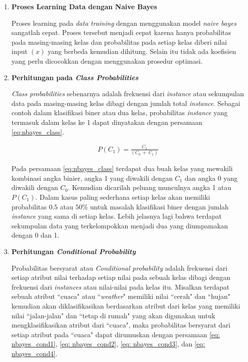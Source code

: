 \begin{subs}
\begin{enumerate}[label=\textbf{\arabic*).}]
		\item \textbf{Proses Learning Data dengan Naive Bayes}
	
		Proses learning pada \textit{data training} dengan menggunakan model \textit{naive bayes} sangatlah cepat. Proses tersebut menjadi cepat karena hanya probabilitas pada masing-masing kelas dan probabilitas pada setiap kelas diberi nilai input $(x)$ yang berbeda kemudian dihitung. Selain itu tidak ada koefisien yang perlu dicocokkan dengan menggunakan prosedur optimasi.
	
		\item \textbf{Perhitungan pada \textit{Class Probabilities}}
	
		\textit{Class probabilities} sebenarnya adalah frekuensi dari \textit{instance} atau sekumpulan data pada masing-masing kelas dibagi dengan jumlah total \textit{instance}. Sebagai contoh dalam klasifikasi biner atau dua kelas, probabilitas \textit{instance} yang termasuk dalam kelas ke 1 dapat dinyatakan dengan persamaan \ref{eq:nbayes_class}.
		
		\begin{equation}\label{eq:nbayes_class}
		\begin{split}
		P(C_{1}) = \frac{C_{1}}{(C_{0}\ +\ C_{1})}
		\end{split}
		\end{equation}
		
		Pada persamaan \ref{eq:nbayes_class} terdapat dua buah kelas yang mewakili kombinasi angka binier, angka 1 yang diwakili dengan $C_{1}$ dan angka 0 yang diwakili dengan $C_{0}$. Kemudian dicarilah peluang munculnya angka 1 atau $P(C_{1})$. Dalam kasus paling sederhana setiap kelas akan memiliki probabilitas $0.5$ atau $50\%$ untuk masalah klasifikasi biner dengan jumlah \textit{instance} yang sama di setiap kelas. Lebih jelasnya lagi bahwa terdapat sekumpulan data yang terkelompokkan menjadi dua yang diumpamakan dengan 0 dan 1.
		\vspace{1ex}
	
		\item \textbf{Perhitungan \textit{Conditional Probability}}
	
		Probabilitas bersyarat atau \textit{Conditional probability} adalah frekuensi dari setiap atribut nilai terhadap setiap nilai pada sebuah kelas dibagi dengan frekuensi dari \textit{instances} atau nilai-nilai pada kelas itu. Misalkan terdapat sebuah atribut ``cuaca" atau ``\textit{weather}" memiliki nilai ``cerah" dan ``hujan" kemudian akan diklasifikasikan berdasarkan atribut dari kelas yang memiliki nilai ``jalan-jalan" dan ``tetap di rumah" yang akan digunakan untuk mengklasifikasikan atribut dari ``cuaca", maka probabilitas bersyarat dari setiap atribut pada ``cuaca" dapat dirumuskan dengan persamaan \ref{eq: nbayes_cond1}, \ref{eq: nbayes_cond2}, \ref{eq: nbayes_cond3}, dan \ref{eq: nbayes_cond4}.
	

\end{enumerate}
\end{subs}
